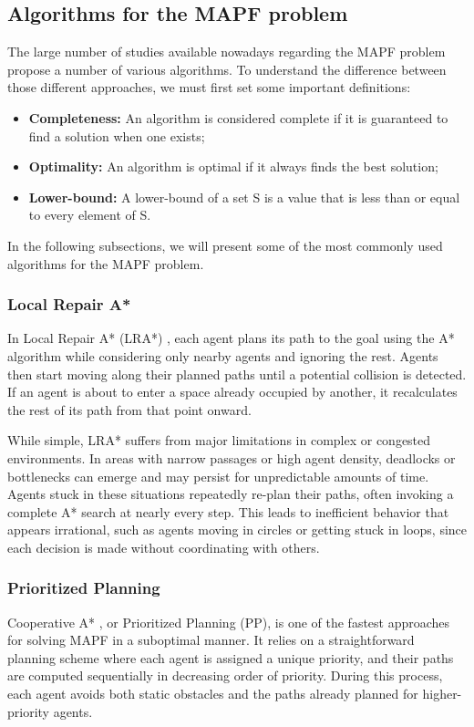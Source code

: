 \subsection{Algorithms for the MAPF problem}
The large number of studies available nowadays regarding the MAPF problem propose a number of various algorithms. To understand the difference between those different approaches, we must first set some important definitions:
\begin{itemize}
    \item \textbf{Completeness: } An algorithm is considered complete if it is guaranteed to find a solution when one exists;
    \item \textbf{Optimality: }  An algorithm is optimal if it always finds the best solution;
    \item \textbf{Lower-bound: } A lower-bound of a set S is a value that is less than or equal to every element of S.
\end{itemize}

In the following subsections, we will present some of the most commonly used algorithms for the MAPF problem.

\subsubsection{Local Repair A*}
In Local Repair A* (LRA*) \cite{silverCooperativePathfinding2005}, each agent plans its path to the goal using the A* algorithm while considering only nearby agents and ignoring the rest. Agents then start moving along their planned paths until a potential collision is detected. If an agent is about to enter a space already occupied by another, it recalculates the rest of its path from that point onward. 

While simple, LRA* suffers from major limitations in complex or congested environments. In areas with narrow passages or high agent density, deadlocks or bottlenecks can emerge and may persist for unpredictable amounts of time. Agents stuck in these situations repeatedly re-plan their paths, often invoking a complete A* search at nearly every step. This leads to  inefficient behavior that appears irrational, such as agents moving in circles or getting stuck in loops, since each decision is made without coordinating with others.

\subsubsection{Prioritized Planning}
Cooperative A* \cite{silverCooperativePathfinding2005}, or Prioritized Planning (PP), is one of the fastest approaches for solving MAPF in a suboptimal manner. It relies on a straightforward planning scheme where each agent is assigned a unique priority, and their paths are computed sequentially in decreasing order of priority. During this process, each agent avoids both static obstacles and the paths already planned for higher-priority agents.

